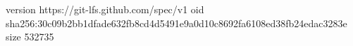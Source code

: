 version https://git-lfs.github.com/spec/v1
oid sha256:30c09b2bb1dfade632fb8cd4d5491e9a0d10c8692fa6108ed38fb24edac3283e
size 532735
